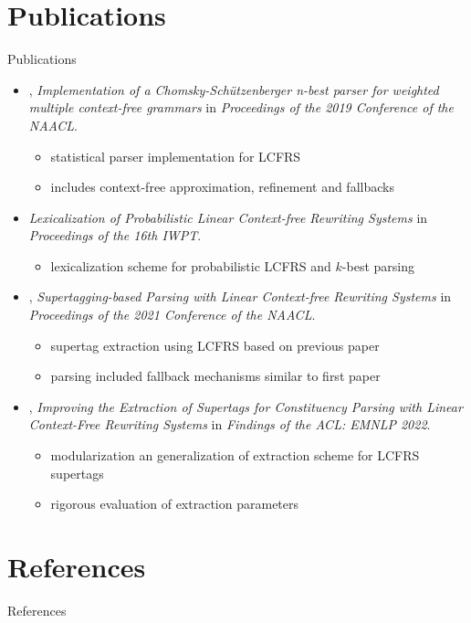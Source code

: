 \documentclass[aspectratio=169, 10pt]{beamer}
\begin{document}
    \section{Publications}
    \begin{frame}{Publications}
        \begin{itemize}
            \item \citealp*{RupDen19}, \emph{Implementation of a {C}homsky-Sch{\"u}tzenberger n-best parser for weighted multiple context-free grammars} in \emph{Proceedings of the 2019 Conference of the NAACL}.
                \begin{itemize}
                    \item statistical parser implementation for LCFRS
                    \item includes context-free approximation, refinement and fallbacks
                \end{itemize}
            \item \citealp{MoeRup20}\emph{Lexicalization of Probabilistic Linear Context-free Rewriting Systems} in \emph{Proceedings of the 16th IWPT}.
                \begin{itemize}
                    \item lexicalization scheme for probabilistic LCFRS and $k$-best parsing
                \end{itemize}
            \item \citealp{RupMoe21}, \emph{Supertagging-based Parsing with Linear Context-free Rewriting Systems} in \emph{Proceedings of the 2021 Conference of the NAACL}.
                \begin{itemize}
                    \item supertag extraction using LCFRS based on previous paper
                    \item parsing included fallback mechanisms similar to first paper
                \end{itemize}
            \item \citealp{Rup22}, \emph{Improving the Extraction of Supertags for Constituency Parsing with Linear Context-Free Rewriting Systems} in \emph{Findings of the ACL: EMNLP 2022}.
                \begin{itemize}
                    \item modularization an generalization of extraction scheme for LCFRS supertags
                    \item rigorous evaluation of extraction parameters
                \end{itemize}
        \end{itemize}
    \end{frame}


    \section*{References}
    \begin{frame}{References}
        
        
    \end{frame}
\end{document}
